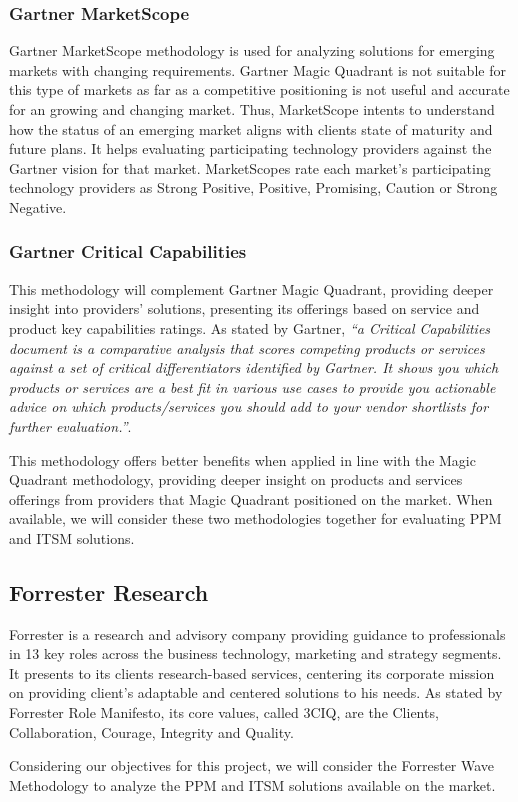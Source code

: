 \subsubsection{Gartner MarketScope}

Gartner MarketScope methodology\cite{GartnerMarketScope} is used for analyzing solutions for emerging markets with changing requirements. Gartner Magic Quadrant is not suitable for this type of markets as far as a competitive positioning is not useful and accurate for an growing and changing market. Thus, MarketScope intents to understand how the status of an emerging market aligns with clients state of maturity and future plans. It helps evaluating participating technology providers against the Gartner vision for that market. MarketScopes rate each market's participating technology providers as Strong Positive, Positive, Promising, Caution or Strong Negative.\par

\subsubsection{Gartner Critical Capabilities}

This methodology\cite{GartnerCriticalCapabilities} will complement Gartner Magic Quadrant, providing deeper insight into providers' solutions, presenting its offerings based on service and product key capabilities ratings. As stated by Gartner\cite{GartnerCriticalCapabilities}, \textit{``a Critical Capabilities document is a comparative analysis that scores competing products or services against a set of critical differentiators identified by Gartner. It shows you which products or services are a best fit in various use cases to provide you actionable advice on which products/services you should add to your vendor shortlists for further evaluation.''}.\par
This methodology offers better benefits when applied in line with the Magic Quadrant methodology, providing deeper insight on products and services offerings from providers that Magic Quadrant positioned on the market. When available, we will consider these two methodologies together for evaluating PPM and ITSM solutions.\par

\subsection{Forrester Research} 

Forrester is a research and advisory company providing guidance to professionals in 13 key roles across the business technology, marketing and strategy segments.\cite{ForresterAbout} It presents to its clients research-based services, centering its corporate mission on providing client's adaptable and centered solutions to his needs. As stated by Forrester Role Manifesto, its core values, called 3CIQ, are the Clients, Collaboration, Courage, Integrity and Quality.\par
Considering our objectives for this project, we will consider the Forrester Wave Methodology to analyze the PPM and ITSM solutions available on the market.

